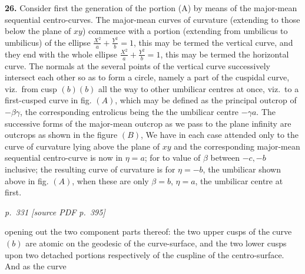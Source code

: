 \documentclass[11pt,a4paper]{article}
\newcommand{\pagemarker}[2]{\par\bigskip\noindent\textit{p.~#1 [source PDF p.~#2]}\par\smallskip}
\begin{document}
\begin{center}
\end{center}

\textbf{26.} Consider first the generation of the portion (A) by means of the major-mean sequential centro-curves. The major-mean curves of curvature (extending to those below the plane of $xy$) commence with a portion (extending from umbilicus to umbilicus) of the ellipse $\tfrac{X^2}{a} + \tfrac{Y^2}{b} = 1$, this may be termed the vertical curve, and they end with the whole ellipse $\tfrac{X^2}{a} + \tfrac{Y^2}{b} = 1$, this may be termed the horizontal curve. The normals at the several points of the vertical curve successively intersect each other so as to form a circle, namely a part of the cuspidal curve, viz.\ from cusp $(b) (b)$ all the way to other umbilicar centres at once, viz.\ to a first-cusped curve in fig. $(A)$, which may be defined as the principal outcrop of $-\beta\gamma$, the corresponding entrolicus being the the umbilicar centre $-\gamma a$. The successive forms of the major-mean outcrop as we pass to the plane infinity are outcrops as shown in the figure $(B)$, We have in each case attended only to the curve of curvature lying above the plane of $xy$ and the corresponding major-mean sequential centro-curve is now in $\eta = a$; for to value of $\beta$ between $-c, -b$ inclusive; the resulting curve of curvature is for $\eta = -b$, the umbilicar shown above in fig. $(A)$, when these are only $\beta = b$, $\eta = a$, the umbilicar centre at first.

\clearpage

\pagemarker{331}{395}

opening out the two component parts thereof: the two upper cusps of the curve $(b)$ are atomic on the geodesic of the curve-surface, and the two lower cusps upon two detached portions respectively of the cuspline of the centro-surface. And as the curve

\begin{center}
\end{center}
\end{document}
